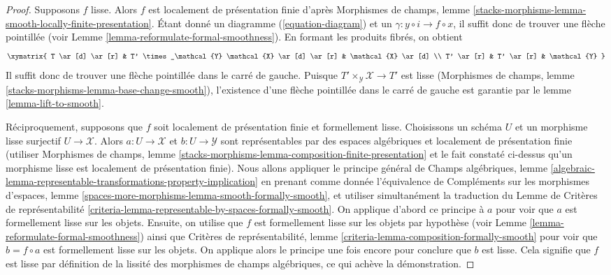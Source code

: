 \begin{proof}
Supposons $f$ lisse. Alors $f$ est localement de présentation finie d'après
Morphismes de champs, lemme
\ref{stacks-morphisms-lemma-smooth-locally-finite-presentation}.
Étant donné un diagramme (\ref{equation-diagram})
et un $\gamma : y \circ i \to f \circ x$, il suffit donc de trouver une
flèche pointillée (voir Lemme \ref{lemma-reformulate-formal-smoothness}).
En formant les produits fibrés, on obtient
$$
\xymatrix{
T \ar[d] \ar[r] &
T' \times_\mathcal{Y} \mathcal{X} \ar[d] \ar[r] &
\mathcal{X} \ar[d] \\
T' \ar[r] & T' \ar[r] & \mathcal{Y}
}
$$
Il suffit donc de trouver une flèche pointillée dans le
carré de gauche. Puisque $T' \times_\mathcal{Y} \mathcal{X} \to T'$
est lisse
(Morphismes de champs, lemme \ref{stacks-morphisms-lemma-base-change-smooth}),
l'existence d'une flèche pointillée dans le carré de gauche est garantie par le
lemme \ref{lemma-lift-to-smooth}.

\medskip\noindent
Réciproquement, supposons que $f$ soit localement de présentation finie et
formellement lisse. Choisissons un schéma $U$ et un morphisme lisse surjectif
$U \to \mathcal{X}$. Alors $a : U \to \mathcal{X}$ et $b : U \to \mathcal{Y}$
sont représentables par des espaces algébriques et localement de présentation finie
(utiliser Morphismes de champs, lemme
\ref{stacks-morphisms-lemma-composition-finite-presentation}
et le fait constaté ci-dessus
qu'un morphisme lisse est localement de présentation finie).
Nous allons appliquer le principe général de
Champs algébriques, lemme
\ref{algebraic-lemma-representable-transformations-property-implication}
en prenant comme donnée l'équivalence de Compléments sur les morphismes d'espaces,
lemme \ref{spaces-more-morphisms-lemma-smooth-formally-smooth},
et utiliser simultanément la traduction du
Lemme de Critères de représentabilité
\ref{criteria-lemma-representable-by-spaces-formally-smooth}.
On applique d'abord ce principe à $a$ pour voir que $a$ est
formellement lisse sur les objets. Ensuite, on utilise que $f$ est
formellement lisse sur les objets par hypothèse
(voir Lemme \ref{lemma-reformulate-formal-smoothness})
ainsi que Critères de représentabilité, lemme
\ref{criteria-lemma-composition-formally-smooth}
pour voir que $b = f \circ a$ est formellement lisse sur les objets.
On applique alors le principe une fois encore pour conclure que $b$ est lisse.
Cela signifie que $f$ est lisse par définition de la lissité
des morphismes de champs algébriques, ce qui achève la démonstration.
\end{proof}









